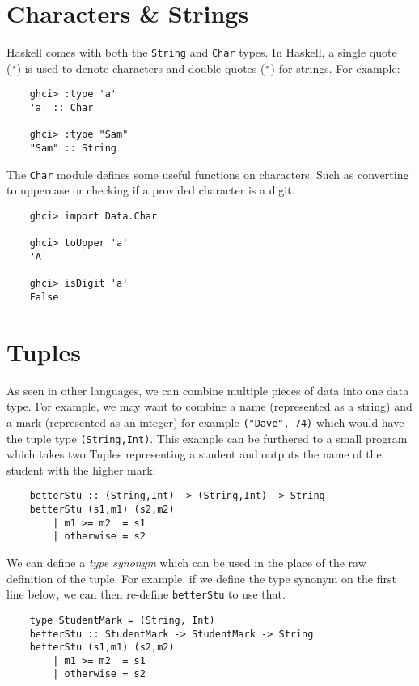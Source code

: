
\section{Characters \& Strings}
Haskell comes with both the \verb|String| and \verb|Char| types. In Haskell, a single quote (\verb|'|) is used to denote characters and double quotes (\verb|"|) for strings. For example:
\begin{verbatim}
    ghci> :type 'a'
    'a' :: Char

    ghci> :type "Sam"
    "Sam" :: String
\end{verbatim}

The \verb|Char| module defines some useful functions on characters. Such as converting to uppercase or checking if a provided character is a digit.
\begin{verbatim}
    ghci> import Data.Char
    
    ghci> toUpper 'a'
    'A'

    ghci> isDigit 'a'
    False
\end{verbatim}

\section{Tuples}
As seen in other languages, we can combine multiple pieces of data into one data type. For example, we may want to combine a name (represented as a string) and a mark (represented as an integer) for example \verb|("Dave", 74)| which would have the tuple type \verb|(String,Int)|. This example can be furthered to a small program which takes two Tuples representing a student and outputs the name of the student with the higher mark:
\begin{verbatim}
    betterStu :: (String,Int) -> (String,Int) -> String
    betterStu (s1,m1) (s2,m2)
        | m1 >= m2  = s1
        | otherwise = s2
\end{verbatim}

We can define a \textit{type synonym} which can be used in the place of the raw definition of the tuple. For example, if we define the type synonym on the first line below, we can then re-define \verb|betterStu| to use that.
\begin{verbatim}
    type StudentMark = (String, Int)
    betterStu :: StudentMark -> StudentMark -> String
    betterStu (s1,m1) (s2,m2)
        | m1 >= m2  = s1
        | otherwise = s2
\end{verbatim}

